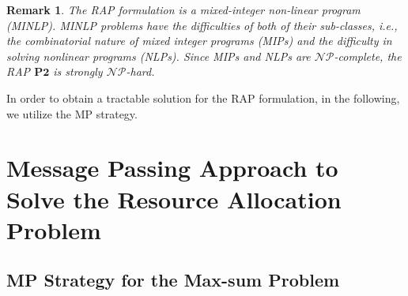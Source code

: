 \documentclass[twocolumn,10pt]{IEEEtran}
\newtheorem{remark}{Remark}
\begin{document}
\begin{remark}
\label{rem:MINLP}
The RAP formulation is a mixed-integer non-linear program (MINLP).  MINLP problems have the difficulties of both of their sub-classes, i.e., the combinatorial nature of mixed integer programs (MIPs) and the difficulty in solving nonlinear programs (NLPs). Since MIPs and NLPs are $\mathcal{NP}$-complete, the RAP $\mathbf{P2}$ is strongly  $\mathcal{NP}$-hard.
\end{remark} 

In order to obtain a tractable solution for the RAP formulation, in the following, we utilize the MP strategy.

\section{Message Passing Approach to Solve the Resource Allocation Problem} \label{sec:rap_mp}

\subsection{MP Strategy for the Max-sum Problem} \label{sec:MP_intro}
\end{document}
